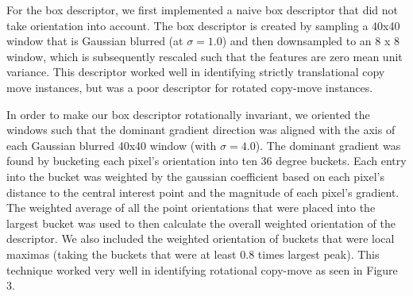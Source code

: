 \documentclass[12pt]{article}
\begin{document}
For the box descriptor, we first implemented a naive box descriptor that did not take orientation into account. The box descriptor is created by sampling a 40x40 window that is Gaussian blurred (at $\sigma = 1.0$) and then downsampled to an 8 x 8 window, which is subsequently rescaled such that the features are zero mean unit variance. This descriptor worked well in identifying strictly translational copy move instances, but was a poor descriptor for rotated copy-move instances.

In order to make our box descriptor rotationally invariant, we oriented the windows such that the dominant gradient direction was aligned with the axis of each Gaussian blurred 40x40 window (with $\sigma = 4.0$). The dominant gradient was found by bucketing each pixel's orientation into ten 36 degree buckets. Each entry into the bucket was  weighted by the gaussian coefficient based on each pixel's distance to the central interest point and the magnitude of each pixel's gradient. The weighted average of all the point orientations that were placed into the largest bucket was used to then calculate the overall weighted orientation of the descriptor. We also included the weighted orientation of buckets that were local maximas (taking the buckets that were at least $0.8$ times largest peak). This technique worked very well in identifying rotational copy-move as seen in Figure 3.
\end{document}
